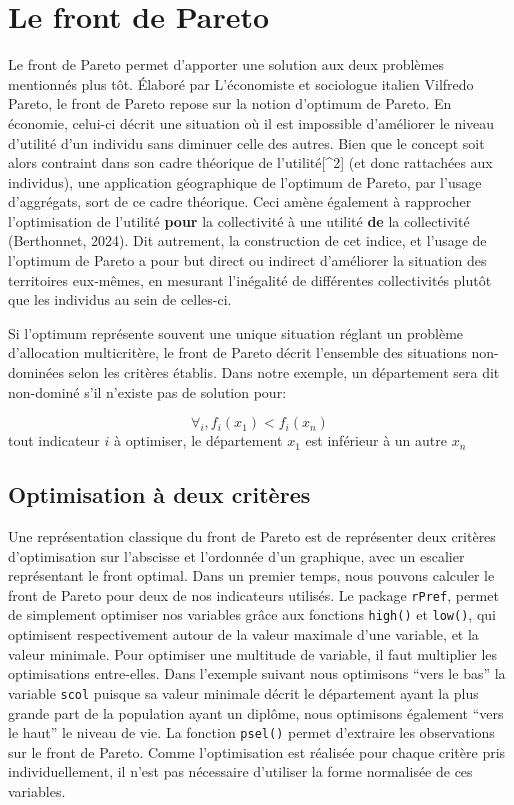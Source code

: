 \documentclass[
  french,
  11pt,
  a4paper,
]{article}
\begin{document}
\section{Le front de Pareto}\label{le-front-de-pareto}

Le front de Pareto permet d'apporter une solution aux deux problèmes
mentionnés plus tôt. Élaboré par L'économiste et sociologue italien
Vilfredo Pareto, le front de Pareto repose sur la notion d'optimum de
Pareto. En économie, celui-ci décrit une situation où il est impossible
d'améliorer le niveau d'utilité d'un individu sans diminuer celle des
autres. Bien que le concept soit alors contraint dans son cadre
théorique de l'utilité{[}\^{}2{]} (et donc rattachées aux individus),
une application géographique de l'optimum de Pareto, par l'usage
d'aggrégats, sort de ce cadre théorique. Ceci amène également à
rapprocher l'optimisation de l'utilité \textbf{pour} la collectivité à
une utilité \textbf{de} la collectivité (Berthonnet, 2024). Dit
autrement, la construction de cet indice, et l'usage de l'optimum de
Pareto a pour but direct ou indirect d'améliorer la situation des
territoires eux-mêmes, en mesurant l'inégalité de différentes
collectivités plutôt que les individus au sein de celles-ci.

Si l'optimum représente souvent une unique situation réglant un problème
d'allocation multicritère, le front de Pareto décrit l'ensemble des
situations non-dominées selon les critères établis. Dans notre exemple,
un département sera dit non-dominé s'il n'existe pas de solution pour:

\[
\forall_i, f_i(x_1)<f_i(x_n)
\] tout indicateur \(i\) à optimiser, le département \(x_1\) est
inférieur à un autre \(x_n\)

\subsection{Optimisation à deux
critères}\label{optimisation-uxe0-deux-crituxe8res}

Une représentation classique du front de Pareto est de représenter deux
critères d'optimisation sur l'abscisse et l'ordonnée d'un graphique,
avec un escalier représentant le front optimal. Dans un premier temps,
nous pouvons calculer le front de Pareto pour deux de nos indicateurs
utilisés. Le package \texttt{rPref}, permet de simplement optimiser nos
variables grâce aux fonctions \texttt{high()} et \texttt{low()}, qui
optimisent respectivement autour de la valeur maximale d'une variable,
et la valeur minimale. Pour optimiser une multitude de variable, il faut
multiplier les optimisations entre-elles. Dans l'exemple suivant nous
optimisons ``vers le bas'' la variable \texttt{scol} puisque sa valeur
minimale décrit le département ayant la plus grande part de la
population ayant un diplôme, nous optimisons également ``vers le haut''
le niveau de vie. La fonction \texttt{psel()} permet d'extraire les
observations sur le front de Pareto. Comme l'optimisation est réalisée
pour chaque critère pris individuellement, il n'est pas nécessaire
d'utiliser la forme normalisée de ces variables.
\end{document}
